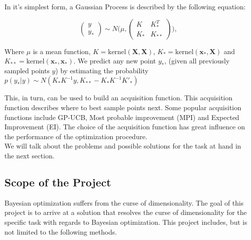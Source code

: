 \documentclass[a4paper,12pt,twoside,openright]{report}
\begin{document}
In it's simplest form, a Gaussian Process is described by the following equation:

\begin{equation}
\begin{pmatrix} y \\
y_* \end{pmatrix} \sim N\Biggl(\mu,\begin{pmatrix} K & K^T_*\\
 K_* & K_{**} \end{pmatrix}\Biggr),
\end{equation}

Where $\mu$ is a mean function, $K = \text{kernel}(\mathbf{X}, \mathbf{X})$, $K_* = \text{kernel}(\mathbf{x_*}, \mathbf{X})$ and $K_{**} = \text{kernel}(\mathbf{x_*}, \mathbf{x_*})$.
We predict any new point $y_*$, (given all previously sampled points $y$) by estimating the probability $ p(y_*|y) \sim N(K_*K^{-1}y,K_{**}-K_*K^{-1}K'_*) $

This, in turn, can be used to build an acquisition function. 
This acquisition function describes where to best sample points next.
Some popular acquisition functions include GP-UCB, Most probable improvement (MPI) and Expected Improvement (EI).
The choice of the acquisition function has great influence on the performance of the optimization procedure.\\

We will talk about the problems and possible solutions for the task at hand in the next section.

\subsection{Scope of the Project}

Bayesian optimization suffers from the curse of dimensionality. 
The goal of this project is to arrive at a solution that resolves the curse of dimensionality for the specific task with regards to Bayesian optimization.
This project includes, but is not limited to the following methods.\\
\end{document}

